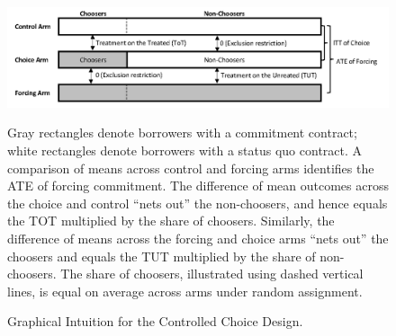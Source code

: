 \documentclass[12pt, a4paper]{article}
\begin{document}
\begin{figure}
\caption{Graphical Intuition for the Controlled Choice Design.} 
    \begin{center}
        \centering
        \includegraphics[width=1.0\textwidth]{Figuras/tot_tut_intuition.png}
    \end{center}
 \footnotesize{
    Gray rectangles denote borrowers with a commitment contract; white rectangles denote borrowers with a status quo contract. 
    A comparison of means across control and forcing arms identifies the ATE of forcing commitment. 
    The difference of mean outcomes across the choice and control ``nets out'' the non-choosers, and hence equals the TOT multiplied by the share of choosers.
    Similarly, the difference of means across the forcing and choice arms ``nets out'' the choosers and equals the TUT multiplied by the share of non-choosers.
        The share of choosers, illustrated using dashed vertical lines, is equal on average across arms under random assignment.}
    \label{tot_tut_graph}
\end{figure}   
\end{document}
